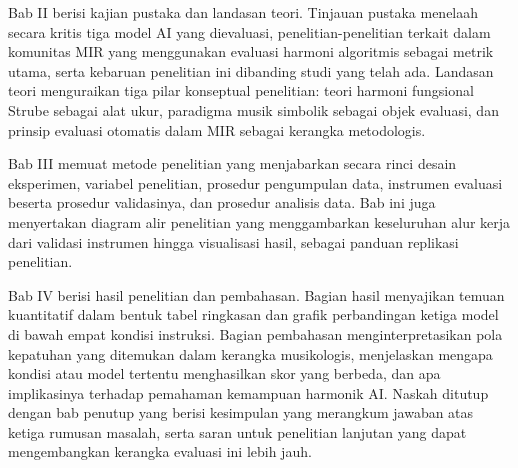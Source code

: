 Bab II berisi kajian pustaka dan landasan teori. Tinjauan pustaka menelaah secara kritis tiga model AI yang dievaluasi, penelitian-penelitian terkait dalam komunitas MIR yang menggunakan evaluasi harmoni algoritmis sebagai metrik utama, serta kebaruan penelitian ini dibanding studi yang telah ada. Landasan teori menguraikan tiga pilar konseptual penelitian: teori harmoni fungsional Strube sebagai alat ukur, paradigma musik simbolik sebagai objek evaluasi, dan prinsip evaluasi otomatis dalam MIR sebagai kerangka metodologis.

Bab III memuat metode penelitian yang menjabarkan secara rinci desain eksperimen, variabel penelitian, prosedur pengumpulan data, instrumen evaluasi beserta prosedur validasinya, dan prosedur analisis data. Bab ini juga menyertakan diagram alir penelitian yang menggambarkan keseluruhan alur kerja dari validasi instrumen hingga visualisasi hasil, sebagai panduan replikasi penelitian.

Bab IV berisi hasil penelitian dan pembahasan. Bagian hasil menyajikan temuan kuantitatif dalam bentuk tabel ringkasan dan grafik perbandingan ketiga model di bawah empat kondisi instruksi. Bagian pembahasan menginterpretasikan pola kepatuhan yang ditemukan dalam kerangka musikologis, menjelaskan mengapa kondisi atau model tertentu menghasilkan skor yang berbeda, dan apa implikasinya terhadap pemahaman kemampuan harmonik AI. Naskah ditutup dengan bab penutup yang berisi kesimpulan yang merangkum jawaban atas ketiga rumusan masalah, serta saran untuk penelitian lanjutan yang dapat mengembangkan kerangka evaluasi ini lebih jauh.
